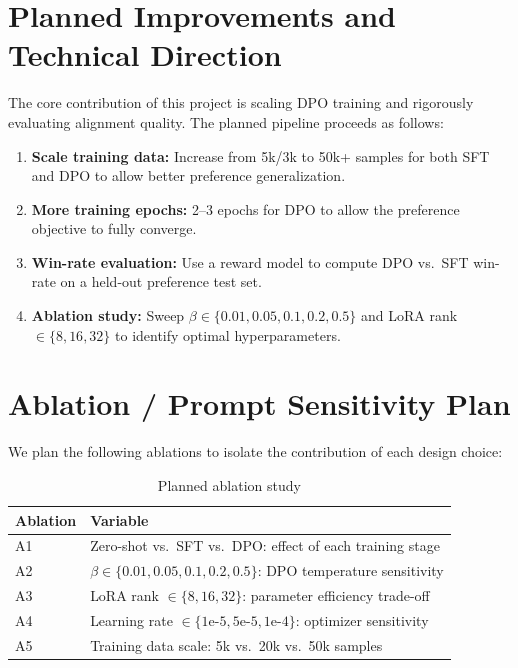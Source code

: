 \documentclass[12pt,a4paper]{article}
\begin{document}
\section{Planned Improvements and Technical Direction}

The core contribution of this project is scaling DPO training and rigorously evaluating
alignment quality. The planned pipeline proceeds as follows:

\begin{enumerate}[noitemsep]
    \item \textbf{Scale training data:} Increase from 5k/3k to 50k+ samples for both
          SFT and DPO to allow better preference generalization.
    \item \textbf{More training epochs:} 2--3 epochs for DPO to allow the preference
          objective to fully converge.
    \item \textbf{Win-rate evaluation:} Use a reward model to compute DPO vs.\ SFT
          win-rate on a held-out preference test set.
    \item \textbf{Ablation study:} Sweep $\beta \in \{0.01, 0.05, 0.1, 0.2, 0.5\}$
          and LoRA rank $\in \{8, 16, 32\}$ to identify optimal hyperparameters.
\end{enumerate}

\section{Ablation / Prompt Sensitivity Plan}

We plan the following ablations to isolate the contribution of each design choice:

\begin{table}[h]
\centering
\begin{tabular}{ll}
\toprule
\textbf{Ablation} & \textbf{Variable} \\
\midrule
A1 & Zero-shot vs.\ SFT vs.\ DPO: effect of each training stage \\
A2 & $\beta \in \{0.01, 0.05, 0.1, 0.2, 0.5\}$: DPO temperature sensitivity \\
A3 & LoRA rank $\in \{8, 16, 32\}$: parameter efficiency trade-off \\
A4 & Learning rate $\in \{1\text{e-}5, 5\text{e-}5, 1\text{e-}4\}$: optimizer sensitivity \\
A5 & Training data scale: 5k vs.\ 20k vs.\ 50k samples \\
\bottomrule
\end{tabular}
\caption{Planned ablation study}
\end{table}
\end{document}

